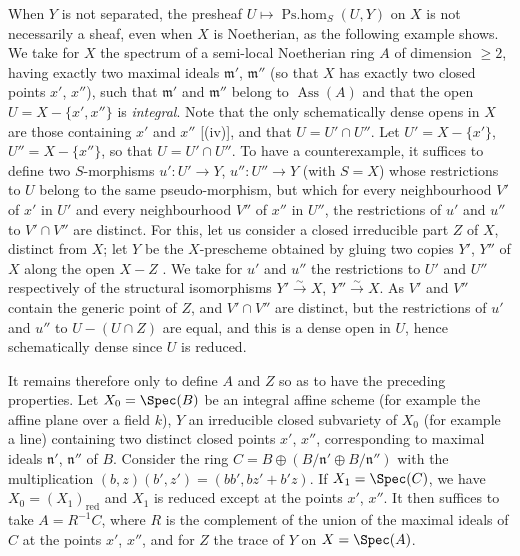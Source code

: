 \begin{remark}[20.2.16]
\label{IV.20.2.16}
When $Y$ is not separated, the presheaf $U\mapsto\operatorname{Ps.hom}_S(U,Y)$ on $X$ is not necessarily a sheaf, even when $X$ is Noetherian, as the following example shows.
We take for $X$ the spectrum of a semi-local Noetherian ring $A$ of dimension $\geq 2$, having exactly two
maximal ideals $\mathfrak{m}'$, $\mathfrak{m}''$ (so that $X$ has exactly two closed points $x'$, $x''$), such that $\mathfrak{m}'$ and $\mathfrak{m}''$ belong to $\operatorname{Ass}(A)$ and that the open $U=X-\{x',x''\}$ is \emph{integral}.
Note that the only schematically dense opens in $X$ are those containing $x'$ and $x''$ [(iv)], and that $U=U'\cap U''$.
Let $U'=X-\{x'\}$, $U''=X-\{x''\}$, so that $U=U'\cap U''$.
To have a counterexample, it suffices to define two $S$-morphisms $u':U'\to Y$, $u'':U''\to Y$ (with $S=X$) whose restrictions to $U$ belong to the same pseudo-morphism, but which for every neighbourhood $V'$ of $x'$ in $U'$ and every neighbourhood $V''$ of $x''$ in $U''$, the restrictions of $u'$ and $u''$ to $V'\cap V''$ are distinct.
For this, let us consider a closed irreducible part $Z$ of $X$, distinct from $X$;
let $Y$ be the $X$-prescheme obtained by gluing two copies $Y'$, $Y''$ of $X$ along the open $X-Z$ .
We take for $u'$ and $u''$ the restrictions to $U'$ and $U''$ respectively of the structural isomorphisms $Y'\xrightarrow{\sim}X$, $Y''\xrightarrow{\sim}X$.
As $V'$ and $V''$ contain the generic point of $Z$, and $V'\cap V''$ are distinct, but the restrictions of $u'$ and $u''$ to $U-(U\cap Z)$ are equal, and this is a dense open in $U$, hence schematically dense since $U$ is reduced.

It remains therefore only to define $A$ and $Z$ so as to have the preceding properties.
Let $X_0=\Spec(B)$ be an integral affine scheme (for example the affine plane over a field $k$), $Y$ an irreducible closed subvariety of $X_0$ (for example a line) containing two distinct closed points $x'$, $x''$, corresponding to maximal ideals $\mathfrak{n}'$, $\mathfrak{n}''$ of $B$.
Consider the ring $C=B\oplus(B/\mathfrak{n}'\oplus B/\mathfrak{n}'')$ with the multiplication $(b,z)(b',z')=(bb',bz'+b'z)$.
If $X_1=\Spec(C)$, we have $X_0=(X_1)_\mathrm{red}$ and $X_1$ is reduced except at the points $x'$, $x''$.
It then suffices to take $A=R^{-1}C$, where $R$ is the complement of the union of the maximal ideals of $C$ at the points $x'$, $x''$, and for $Z$ the trace of $Y$ on $X=\Spec(A)$.
\end{remark}

